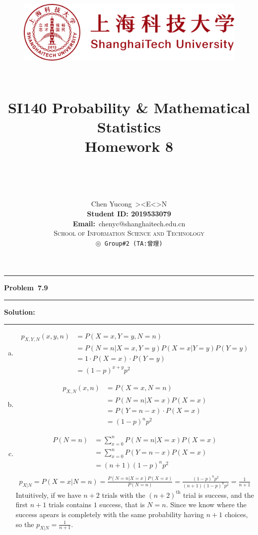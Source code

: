 \documentclass[10.5pt]{article}
\title{
	\normalfont \normalsize
	\begin{figure}[!h]
	\centering
	\includegraphics[width=4.8in, keepaspectratio]{logo_red.pdf}\\[1cm]
	\end{figure}
	\horrule{0.5pt} \\[0.4cm]
	\Huge SI140 Probability \& Mathematical Statistics\\[0.4cm]
	\LARGE Homework 8\\
	\horrule{2pt} \\[1.5cm]
}
\author{\Song{\huge\textbf{陈昱聪}}\\[0.2cm]Chen Yucong\ ><E<>N\\[4.5cm]\textbf{Student ID: 2019533079}\\[0.2cm] 
\textbf{Email:}\ {\ttfamily chenyc@shanghaitech.edu.cn}\\[0.8cm] \LARGE\textsc{School of Information Science and Technology}\\[0.63cm]
\texttt{$\circledcirc$ Group\#2\ (TA:曾理)}}
\date{}
\newcommand\question[1]{\vspace{.2in}\hrule\vspace{0.04in}\textbf{Problem\ #1}\vspace{.4em}\hrule\vspace{.10in}}
\newcommand\Solution{\vspace{.3in}\textbf{Solution:}\vspace{.5em}\hrule\vspace{.08in}\par}
\begin{document}
	
\maketitle
\thispagestyle{firstpage}
\thispagestyle{empty}
\setcounter{page}{0}



\question{7.9}
\Solution{}
\begin{enumerate}[(a)]
	\item \begin{align*}
		p_{X, Y, N}(x, y, n) 
		&= P(X = x, Y = y, N = n)\\[6pt]
		&= P(N = n | X = x, Y = y)P(X = x|Y = y)P(Y = y)\\[6pt]
		&= 1\cdot P(X = x)\cdot P(Y = y)\\[6pt]
		&= {(1 - p)}^{x+y}p^2
	\end{align*}\vspace{0.5cm}
	\item \begin{align*}
		p_{X, N}(x, n) 
		&= P(X = x, N = n)\\[6pt]
		&= P(N = n | X = x)P(X = x)\\[6pt]
		&= P(Y = n - x)\cdot P(X = x)\\[6pt]
		&= (1-p)^{n}p^2
	\end{align*}\vspace{0.5cm}
	\item 
	\begin{align*}
		P(N = n) &= \sum_{x = 0}^{n} P(N = n|X = x)P(X = x)\\[6pt]
		&= \sum_{x = 0}^{n} P(Y = n - x)P(X = x)\\[6pt]
		&= (n+1)(1-p)^np^2\\[6pt]
	\end{align*}
	\begin{align*}
		p_{X|N} = P(X = x|N = n) = \frac{P(N = n|X = x)P(X = x)}{P(N = n)} = \frac{(1 - p)^np^2}{(n+1)(1-p)^np^2} = \frac{1}{n+1}
	\end{align*}
	Intuitively, if we have $n+2$ trials with the $(n+2)^{\text{th}}$ trial is success, and the first $n+1$ trials contains $1$ success, that is $N = n$. Since we know where the success apears is completely with the same probability having $n+1$ choices, so the $p_{X|N} = \frac{1}{n+1}$.
\end{enumerate}
\end{document}
